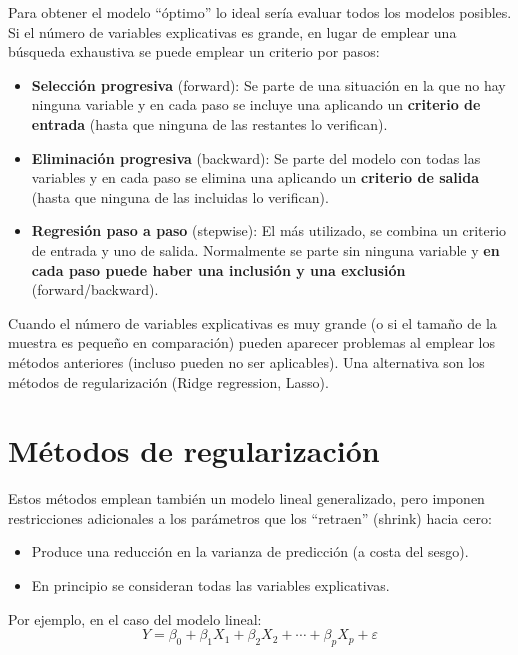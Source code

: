 \documentclass[]{book}
\begin{document}
Para obtener el modelo ``óptimo'' lo ideal sería evaluar todos los modelos posibles.
Si el número de variables explicativas es grande, en lugar de emplear una
búsqueda exhaustiva se puede emplear un criterio por pasos:

\begin{itemize}
\item
  \textbf{Selección progresiva} (forward): Se parte de una situación en la
  que no hay ninguna variable y en cada paso se incluye una aplicando
  un \textbf{criterio de entrada} (hasta que ninguna de las restantes lo
  verifican).
\item
  \textbf{Eliminación progresiva} (backward): Se parte del modelo con todas
  las variables y en cada paso se elimina una aplicando un \textbf{criterio
  de salida} (hasta que ninguna de las incluidas lo verifican).
\item
  \textbf{Regresión paso a paso} (stepwise): El más utilizado, se combina
  un criterio de entrada y uno de salida. Normalmente se parte sin
  ninguna variable y \textbf{en cada paso puede haber una inclusión y una
  exclusión} (forward/backward).
\end{itemize}

Cuando el número de variables explicativas es muy grande (o si el tamaño de la
muestra es pequeño en comparación) pueden aparecer problemas al emplear los
métodos anteriores (incluso pueden no ser aplicables). Una alternativa son los
métodos de regularización (Ridge regression, Lasso).

\hypertarget{metodos-de-regularizacion}{%
\section{Métodos de regularización}\label{metodos-de-regularizacion}}

Estos métodos emplean también un modelo lineal generalizado,
pero imponen restricciones adicionales a los parámetros que los
``retraen'' (shrink) hacia cero:

\begin{itemize}
\item
  Produce una reducción en la varianza de predicción (a
  costa del sesgo).
\item
  En principio se consideran todas las variables explicativas.
\end{itemize}

Por ejemplo, en el caso del modelo lineal:
\[Y=\beta_{0}+\beta_{1}X_{1}+\beta_{2}X_{2}+\cdots+\beta_{p}X_{p}+\varepsilon\]
\end{document}
